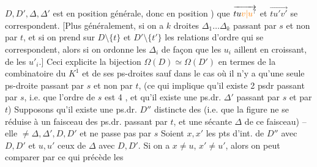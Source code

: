 $D,D',\Delta,\Delta'$ est en position générale, donc en
position ) que $\overrightarrow{tu\unsure{v|u}}$ et $\overrightarrow{tu'v'}$ se correspondent.
[Plus généralement, si on a $k$ droites
$\Delta_1\ldots\Delta_k$ passant par $s$ et non par $t$,  et si
on prend sur $D\setminus\{t\}$ et $D'\setminus\{t'\}$ les relations
d'ordre  qui se correspondent, alors si on ordonne
les $\Delta_i$ de façon que les  $u_i$ aillent en
croissant, de  les $u'_i$.] Ceci explicite la
bijection $\Omega(D)\simeq\Omega(D')$ en termes de la
combinatoire du $K^1$ et de ses ps-droites
sauf dans le cas où il n'y a qu'une seule ps-droite \inserted{$\Delta$} passant par $s$ et non par $t$, (ce qui implique
qu'il existe  2 psdr passant par $s$, i.e. que
l'ordre de $s$ est 4 \unsure{\}|)}, et qu'il existe une ps.dr. $\Delta'$
passant par $s$ et par $t$) Supposons qu'il existe une
ps.dr. $D''$  distincte des  (i.e. que la figure
ne se réduise à un faisceau des ps.dr. passant
par $t$, et une sécante $\Delta$ de ce faisceau) --
elle    $\ne\Delta,\Delta',D,D'$ et ne passe pas par $s$
Soient $x,x'$ les pts d'int. de $D''$ avec $D,D'$ et $u,u'$
ceux de $\Delta$ avec $D,D'$. Si on a $x\ne u$, $x'\ne u'$, alors
on peut comparer par ce qui précède les  

